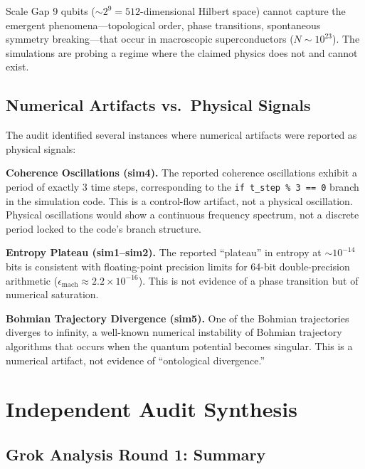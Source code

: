 \documentclass[11pt,a4paper]{article}
\begin{document}
\begin{warnbox}{Scale Gap}
9 qubits ($\sim 2^9 = 512$-dimensional Hilbert space) cannot capture the emergent phenomena---topological order, phase transitions, spontaneous symmetry breaking---that occur in macroscopic superconductors ($N \sim 10^{23}$). The simulations are probing a regime where the claimed physics does not and cannot exist.
\end{warnbox}

\subsection{Numerical Artifacts vs.\ Physical Signals}

The audit identified several instances where numerical artifacts were reported as physical signals:

\textbf{Coherence Oscillations (sim4).} The reported coherence oscillations exhibit a period of exactly 3 time steps, corresponding to the \texttt{if t\_step \% 3 == 0} branch in the simulation code. This is a control-flow artifact, not a physical oscillation. Physical oscillations would show a continuous frequency spectrum, not a discrete period locked to the code's branch structure.

\textbf{Entropy Plateau (sim1--sim2).} The reported ``plateau'' in entropy at $\sim 10^{-14}$ bits is consistent with floating-point precision limits for 64-bit double-precision arithmetic ($\epsilon_{\text{mach}} \approx 2.2 \times 10^{-16}$). This is not evidence of a phase transition but of numerical saturation.

\textbf{Bohmian Trajectory Divergence (sim5).} One of the Bohmian trajectories diverges to infinity, a well-known numerical instability of Bohmian trajectory algorithms that occurs when the quantum potential becomes singular. This is a numerical artifact, not evidence of ``ontological divergence.''

\section{Independent Audit Synthesis}

\subsection{Grok Analysis Round 1: Summary}
\end{document}
